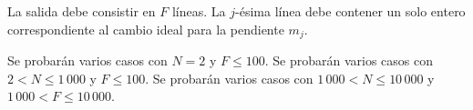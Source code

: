 \documentclass{oci}
\begin{document}
\begin{outputDescription}
La salida debe consistir en $F$ líneas.
La $j$-ésima línea debe contener un solo entero correspondiente al cambio ideal
para la pendiente $m_j$.
\end{outputDescription}

\begin{scoreDescription}
   Se probarán varios casos con $N=2$ y $F\leq 100$.
   Se probarán varios casos con $2 < N \leq 1\,000$ y $F\leq 100$.
   Se probarán varios casos con $1\,000< N \leq 10\,000$ y $1\,000 <
  F\leq 10\,000$.
\end{scoreDescription}

\begin{sampleDescription}
\end{sampleDescription}
\end{document}
